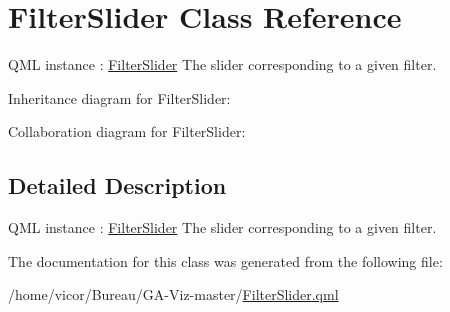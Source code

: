 \hypertarget{class_filter_slider}{}\section{Filter\+Slider Class Reference}
\label{class_filter_slider}


Q\+ML instance \+: \hyperlink{class_filter_slider}{Filter\+Slider} The slider corresponding to a given filter.  




Inheritance diagram for Filter\+Slider\+:


Collaboration diagram for Filter\+Slider\+:


\subsection{Detailed Description}
Q\+ML instance \+: \hyperlink{class_filter_slider}{Filter\+Slider} The slider corresponding to a given filter. 

The documentation for this class was generated from the following file\+:\begin{DoxyCompactItemize}
\item 
/home/vicor/\+Bureau/\+G\+A-\/\+Viz-\/master/\hyperlink{_filter_slider_8qml}{Filter\+Slider.\+qml}\end{DoxyCompactItemize}
